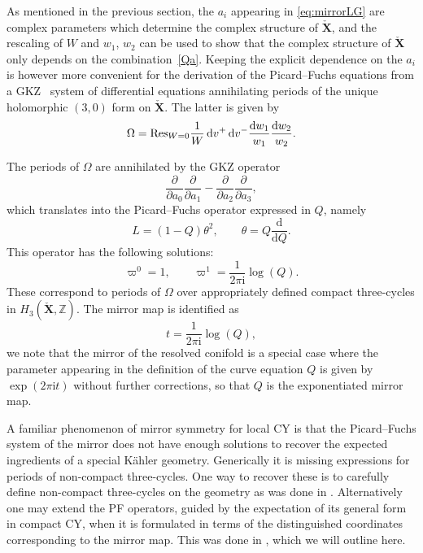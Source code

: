 \documentclass[pdftex]{sigma}
\numberwithin{equation}{section}
\begin{document}
As mentioned in the previous section, the $a_i$ appearing in \eqref{eq:mirrorLG} are complex parameters which determine the complex structure of $\check{\mathbf{X}}$, and the rescaling of $W$ and $w_1$, $w_2$ can be used to show that the complex structure of $\check{\mathbf{X}}$ only depends on the combination~\eqref{Qa}.
Keeping the explicit dependence on the $a_i$ is however more convenient for the derivation of the Picard--Fuchs equations from a GKZ~\cite{GKZ}
system of differential equations annihilating periods of the unique holomorphic $(3,0)$ form on $\check{\mathbf{X}}$. The latter is given by
\begin{equation*}
 \Omega = \textrm{Res}_{W=0} \frac{1}{W} \,{\rm d}v^+ \,{\rm d}v^- \frac{{\rm d}w_1}{w_1} \frac{{\rm d}w_2}{w_2}.
\end{equation*}

The periods of $\Omega$ are annihilated by the GKZ operator
\begin{equation*}
 \frac{\partial}{\partial a_0} \frac{\partial}{\partial a_1}- \frac{\partial}{\partial a_2} \frac{\partial}{\partial a_3},
\end{equation*}
which translates into the Picard--Fuchs operator expressed in $Q$, namely
\begin{equation*}
 L= (1-Q)\theta^2, \qquad \theta=Q\frac{\mathrm{d}}{\mathrm{d}Q}.
\end{equation*}
This operator has the following solutions:
\begin{equation*}
 \varpi^0=1, \qquad \varpi^1=\frac{1}{2\pi \mathrm{i}}\log (Q).
\end{equation*}
These correspond to periods of $\Omega$ over appropriately defined compact three-cycles in $H_3(\check{\mathbf{X}},\mathbb{Z})$. The mirror map is identified as
\begin{equation*}
 t= \frac{1}{2\pi \mathrm{i}} \log (Q),
\end{equation*}
we note that the mirror of the resolved conifold is a special case where the parameter appearing in the definition of the curve equation $Q$ is given by $\exp(2\pi \mathrm{i} t )$ without further corrections, so that $Q$ is the exponentiated mirror map.

A familiar phenomenon of mirror symmetry for local CY is that the Picard--Fuchs system of the mirror does not have enough solutions to recover the expected ingredients of a special K\"ahler geometry. Generically it is missing expressions for periods of non-compact three-cycles. One way to recover these is to carefully define non-compact three-cycles on the geometry as was done in \cite{Hosonolocal}. Alternatively one may extend the PF operators, guided by the expectation of its general form in compact CY, when it is formulated in terms of the distinguished coordinates corresponding to the mirror map. This was done in \cite{Forbes}, which we will outline here.
\end{document}
